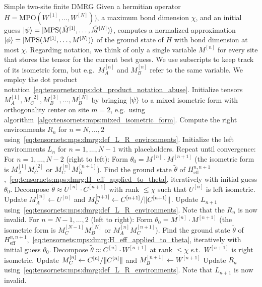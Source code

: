 \begin{Algorithm}{Simple two-site finite DMRG}{
    Given a hermitian operator $H = \text{MPO}(W^{[1]}, \dots, W^{[N]}))$, a maximum bond dimension $\chi$, and an initial guess $\ket{\psi} = \ket{\text{MPS}(\tilde{M}^{[1]},\dots,\tilde{M}^{[N]})}$, computes a normalized  approximation $\ket{\phi} = \ket{\text{MPS}(M^{[1]}, \dots, M^{[N]})}$ of the ground state of $H$ with bond dimension at most $\chi$.
    Regarding notation, we think of only a single variable $M^{[n]}$ for every site that stores the  tensor for the current best guess. We use subscripts to keep track of its isometric form, but e.g.~$M_A^{[n]}$ and $M_B^{[n]}$ refer to the same variable.
    We employ the dot product notation~\eqref{eq:tensornets:mps:dot_product_notation_abuse}.
    \label{algo:tensornets:mps:dmrg}
}
    \step Initialize  tensors $M_A^{[1]}, M_C^{[2]}, M_B^{[3]}, \dots, M_B^{[N]}$ by bringing $\ket{\psi}$ to a mixed isometric form with orthogonality center on site $m=2$, e.g.~using algorithm~\ref{algo:tensornets:mps:mixed_isometric_form}.
    \step Compute the right environments $R_n$ for $n=N,\dots, 2$ using~\eqref{eq:tensornets:mps:dmrg:def_L_R_environments}.
    \step Initialize the left environments $L_n$ for $n=1, \dots, N-1$ with placeholders.
    \step Repeat until convergence:
    \step \quad For $n = 1, \dots , N-2$ (right to left):
    \step \qquad Form $\theta_0 = M^{[n]} \cdot M^{[n+1]}$ (the isometric form is $M_A^{[1]}M_C^{[2]}$ or $M_C^{[n]}M_B^{[n+1]}$).
    \step \qquad Find the ground state $\tilde \theta$ of $H^{n,n+1}_\text{eff}$,~\eqref{eq:tensornets:mps:dmrg:H_eff_applied_to_theta}, iteratively with initial guess $\theta_0$.
    \step \qquad  \label{step:tensornets:mps:dmrg:decomposition1}
    Decompose $\tilde\theta \approx U^{[n]} \cdot C^{[n+1]}$ with rank $\leq \chi$ such that $U^{[n]}$ is left isometric.
    \step \qquad Update $M_A^{[n]} \gets U^{[n]}$ and $M_C^{[n+1]} \gets C^{[n+1]} / \norm{C^{[n+1]}}$.
    \step \qquad Update $L_{n+1}$ using~\eqref{eq:tensornets:mps:dmrg:def_L_R_environments}. Note that the $R_n$ is now invalid.
    \step \quad For $n = N - 1, \dots, 2$ (left to right):
    \step \qquad Form $\theta_0 = M^{[n]} \cdot M^{[n+1]}$ (the isometric form is $M_C^{[N-1]} M_B^{[N]}$ or $M_A^{[n]} M_C^{[n + 1]}$).
    \step \qquad Find the ground state $\tilde \theta$ of $H^{n,n+1}_\text{eff}$,~\eqref{eq:tensornets:mps:dmrg:H_eff_applied_to_theta}, iteratively with initial guess $\theta_0$.
    \step \qquad \label{step:tensornets:mps:dmrg:decomposition2}
    Decompose $\tilde\theta \approx C^{[n]} \cdot W^{[n+1]}$ at rank $\leq \chi$ s.t.~$W^{[n+1]}$ is right isometric.
    \step \qquad Update $M_C^{[n]} \gets C^{[n]} / \norm{C^{[n]}}$ and $M_B^{[n+1]} \gets W^{[n+1]}$
    \step \qquad Update $R_n$ using~\eqref{eq:tensornets:mps:dmrg:def_L_R_environments}. Note that $L_{n+1}$ is now invalid.
\end{Algorithm}

